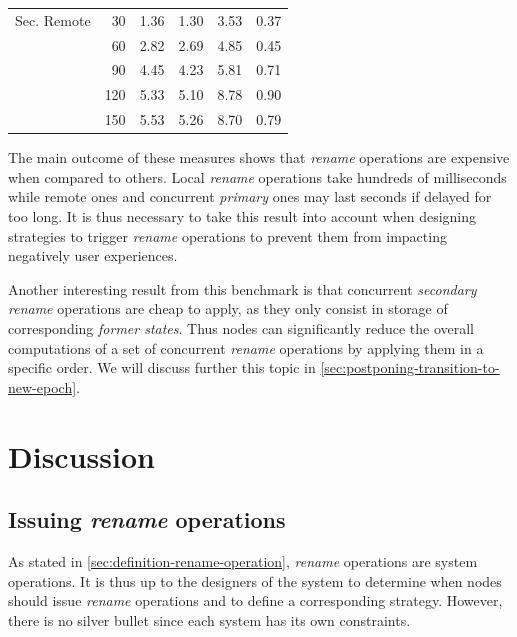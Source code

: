 \documentclass[10pt,journal,compsoc]{IEEEtran}
\begin{document}
\begin{table}[t!]
{\begin{tabular}{lrrrrr}
            Sec. Remote & 30  &     1.36 &     1.30 &       3.53 &   0.37 \\
                                    & 60  &     2.82 &     2.69 &       4.85 &   0.45 \\
                                    & 90  &     4.45 &     4.23 &       5.81 &   0.71 \\
                                    & 120 &     5.33 &     5.10 &       8.78 &   0.90 \\
                                    & 150 &     5.53 &     5.26 &       8.70 &   0.79 \\
            \bottomrule
        \end{tabular}
    }
\end{table}

The main outcome of these measures shows that \emph{rename} operations are expensive when compared to others.
Local \emph{rename} operations take hundreds of milliseconds while remote ones and concurrent \emph{primary} ones may last seconds if delayed for too long.
It is thus necessary to take this result into account when designing strategies to trigger \emph{rename} operations to prevent them from impacting negatively user experiences.

Another interesting result from this benchmark is that concurrent \emph{secondary rename} operations are cheap to apply, as they only consist in storage of corresponding \emph{former states}.
Thus nodes can significantly reduce the overall computations of a set of concurrent \emph{rename} operations by applying them in a specific order.
We will discuss further this topic in \autoref{sec:postponing-transition-to-new-epoch}.

\section{Discussion}

\label{sec:discussion}

\subsection{Issuing \emph{rename} operations}
\label{sec:issuing-rename-operations}

As stated in \autoref{sec:definition-rename-operation}, \emph{rename} operations are system operations.
It is thus up to the designers of the system to determine when nodes should issue \emph{rename} operations and to define a corresponding strategy.
However, there is no silver bullet since each system has its own constraints.
\end{document}
